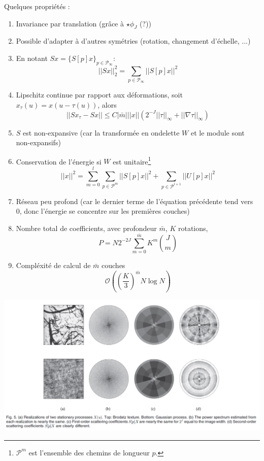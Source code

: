 \documentclass[11pt]{article} %
\begin{document}
\par
Quelques propriétés :
\begin{enumerate}
	\item Invariance par translation (grâce à $\star\phi_J$ (?))
	\item Possible d'adapter à d'autres symétries (rotation, changement d'échelle, ...)
	\item En notant $Sx =\{S[p]x\}_{p\in\mathcal{P}_\infty}$:
		\begin{equation}
			||Sx||_2^2 = \sum_{p\in\mathcal{P}_\infty}||S[p]x||^2
		\end{equation}
	\item Lipschitz continue par rapport aux déformations, soit $x_\tau(u) = x(u-\tau(u))$, alors
	\begin{equation}
		||Sx_\tau - Sx||\leq C|\bar m|||x||(2^{-J}||\tau||_\infty + ||\nabla \tau||_\infty)
	\end{equation}
	\item $S$ est non-expansive (car la transformée en ondelette $W$ et le module sont non-expansifs)
	\item Conservation de l'énergie si $W$ est unitaire\footnote{$\mathcal{P}^m$ est l'ensemble des chemins de longueur $p$.}
	\begin{equation}
		||x||^2 = \sum_{m=0}^{l}\sum_{p\in\mathcal{P}^m}||S[p]x||^2 + \sum_{p\in\mathcal{P}^{l+1}}||U[p]x||^2
	\end{equation}
	\item Réseau peu profond (car le dernier terme de l'équation précédente tend vers 0, donc l'énergie se concentre sur les premières couches)
	\item Nombre total de coefficients, avec profondeur $\bar m$, $K$ rotations,
		\begin{equation}
			P = N2^{-2J}\sum_{m=0}^{\bar m} K^m\binom{J}{m}
		\end{equation} 
	\item Compléxité de calcul de $\bar m$ couches
	\begin{equation}
		\mathcal{O}\left(\left(\frac{K}{3}\right)^{\bar m} N\log{N}\right)
	\end{equation}	
\end{enumerate}
\raggedleft\includegraphics[width=1.2\textwidth]{scat_station}
\end{document}
